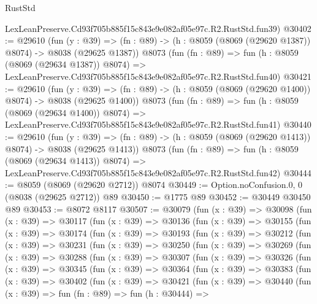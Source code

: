 \begin{lexlean}{RustStd}
\begin{coremodule}
    LexLeanPreserve.Cd93f705b885f15c843e9e082af05e97c.R2.RustStd.fun39)
@30402 := @29610
    (fun (y : @39) =>
    (fn : @89) -> (h : @8059 (@8069 (@29620 @1387)) @8074) -> @8038 (@29625 @1387))
    @8073
    (fun (fn : @89) =>
    fun (h : @8059 (@8069 (@29634 @1387)) @8074) =>
    LexLeanPreserve.Cd93f705b885f15c843e9e082af05e97c.R2.RustStd.fun40)
@30421 := @29610
    (fun (y : @39) =>
    (fn : @89) -> (h : @8059 (@8069 (@29620 @1400)) @8074) -> @8038 (@29625 @1400))
    @8073
    (fun (fn : @89) =>
    fun (h : @8059 (@8069 (@29634 @1400)) @8074) =>
    LexLeanPreserve.Cd93f705b885f15c843e9e082af05e97c.R2.RustStd.fun41)
@30440 := @29610
    (fun (y : @39) =>
    (fn : @89) -> (h : @8059 (@8069 (@29620 @1413)) @8074) -> @8038 (@29625 @1413))
    @8073
    (fun (fn : @89) =>
    fun (h : @8059 (@8069 (@29634 @1413)) @8074) =>
    LexLeanPreserve.Cd93f705b885f15c843e9e082af05e97c.R2.RustStd.fun42)
@30444 := @8059 (@8069 (@29620 @2712)) @8074
@30449 := Option.noConfusion.{0, 0} (@8038 (@29625 @2712)) @89
@30450 := @1775 @89
@30452 := @30449 @30450 @89
@30453 := @8072 @8117
@30507 := @30079
    (fun (x : @39) =>
    @30098
      (fun (x : @39) =>
      @30117
        (fun (x : @39) =>
        @30136
          (fun (x : @39) =>
          @30155
            (fun (x : @39) =>
            @30174
              (fun (x : @39) =>
              @30193
                (fun (x : @39) =>
                @30212
                  (fun (x : @39) =>
                  @30231
                    (fun (x : @39) =>
                    @30250
                      (fun (x : @39) =>
                      @30269
                        (fun (x : @39) =>
                        @30288
                          (fun (x : @39) =>
                          @30307
                            (fun (x : @39) =>
                            @30326
                              (fun (x : @39) =>
                              @30345
                                (fun (x : @39) =>
                                @30364
                                  (fun (x : @39) =>
                                  @30383
                                    (fun (x : @39) =>
                                    @30402
                                      (fun (x : @39) =>
                                      @30421
                                        (fun (x : @39) =>
                                        @30440
                                          (fun (x : @39) =>
                                          fun (fn : @89) =>
                                          fun (h : @30444) =>

\end{coremodule}
\end{lexlean}
